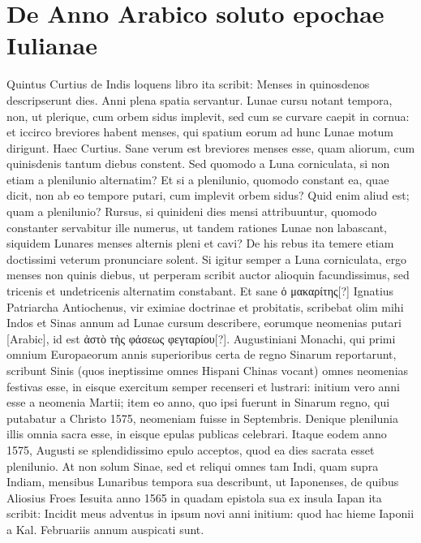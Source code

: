 \section{De Anno Arabico soluto epochae Iulianae}
%
Quintus Curtius de Indis loquens libro  ita scribit: Menses
in quinosdenos descripserunt dies.
Anni plena spatia servantur.
Lunae cursu notant tempora, non, ut plerique, cum orbem
sidus implevit, sed cum se curvare caepit in cornua: et iccirco breviores
habent menses, qui spatium eorum ad hunc Lunae motum dirigunt.
Haec Curtius.
Sane verum est breviores menses esse, quam aliorum,
cum quinisdenis tantum diebus constent.
Sed quomodo a Luna
corniculata, si non etiam a plenilunio alternatim?
Et si a plenilunio,
quomodo constant ea, quae dicit, non ab eo tempore putari, cum implevit
orbem sidus?
Quid enim aliud est; quam a plenilunio?
Rursus,
si quinideni dies mensi attribuuntur, quomodo constanter servabitur
ille numerus, ut tandem rationes Lunae non labascant, siquidem Lunares
menses alternis pleni et cavi?
De his rebus ita temere etiam doctissimi
veterum pronunciare solent.
Si igitur semper a Luna corniculata,
ergo menses non quinis diebus, ut perperam scribit auctor alioquin
facundissimus, sed tricenis et undetricenis alternatim constabant.
Et sane \textgreek{ὁ μακαρίτης[?]} Ignatius Patriarcha Antiochenus,
 vir eximiae
doctrinae et probitatis, scribebat olim mihi Indos et Sinas annum ad
Lunae cursum describere, eorumque neomenias putari \textarabic{}[Arabic],
id est \textgreek{ἀστὸ τὴς φάσεως φεγταρίου[?]}.
Augustiniani Monachi, qui primi
omnium Europaeorum annis superioribus certa de regno Sinarum
reportarunt, scribunt Sinis (quos ineptissime omnes Hispani Chinas
vocant) omnes neomenias festivas esse, in eisque exercitum semper
recenseri et lustrari: initium vero anni esse a neomenia Martii;
item eo anno, quo ipsi fuerunt in Sinarum regno, qui putabatur a
Christo 1575, neomeniam fuisse in  Septembris.
Denique plenilunia
illis omnia sacra esse, in eisque epulas publicas celebrari.
Itaque
eodem anno 1575,  Augusti se splendidissimo epulo acceptos,
quod ea dies sacrata esset plenilunio.
At non solum Sinae, sed et reliqui
omnes tam Indi, quam supra Indiam, mensibus Lunaribus tempora
sua describunt, ut Iaponenses, de quibus Aliosius Froes Iesuita
anno 1565 in quadam epistola sua ex insula Iapan ita scribit: Incidit
meus adventus in ipsum novi anni initium: quod hac hieme Iaponii
a Kal. %
 Februariis annum auspicati sunt.
